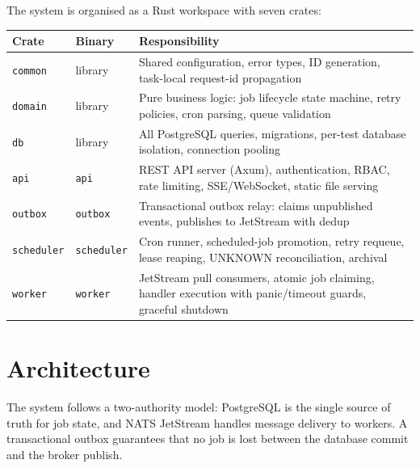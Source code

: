 \documentclass[11pt,a4paper]{article}
\begin{document}
The system is organised as a Rust workspace with seven crates:

\begin{table}[h]
\centering
\begin{tabular}{llp{9cm}}
\toprule
\textbf{Crate} & \textbf{Binary} & \textbf{Responsibility} \\
\midrule
\texttt{common} & library & Shared configuration, error types, ID generation, task-local request-id propagation \\
\texttt{domain} & library & Pure business logic: job lifecycle state machine, retry policies, cron parsing, queue validation \\
\texttt{db} & library & All PostgreSQL queries, migrations, per-test database isolation, connection pooling \\
\texttt{api} & \texttt{api} & REST API server (Axum), authentication, RBAC, rate limiting, SSE/WebSocket, static file serving \\
\texttt{outbox} & \texttt{outbox} & Transactional outbox relay: claims unpublished events, publishes to JetStream with dedup \\
\texttt{scheduler} & \texttt{scheduler} & Cron runner, scheduled-job promotion, retry requeue, lease reaping, UNKNOWN reconciliation, archival \\
\texttt{worker} & \texttt{worker} & JetStream pull consumers, atomic job claiming, handler execution with panic/timeout guards, graceful shutdown \\
\bottomrule
\end{tabular}
\end{table}

\section{Architecture}

The system follows a two-authority model: PostgreSQL is the single source of
truth for job state, and NATS JetStream handles message delivery to workers.
A transactional outbox guarantees that no job is lost between the database
commit and the broker publish.
\end{document}
